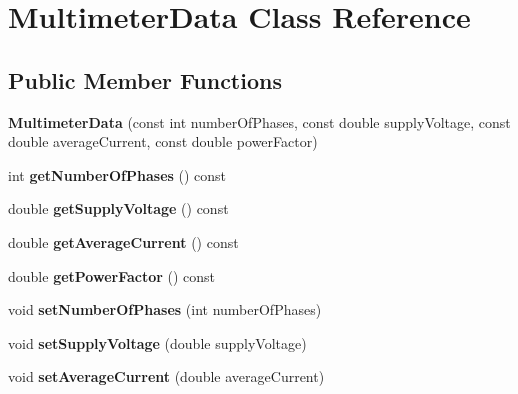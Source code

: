 \hypertarget{class_multimeter_data}{}\section{Multimeter\+Data Class Reference}
\label{class_multimeter_data}
\subsection*{Public Member Functions}
\begin{DoxyCompactItemize}
\item 
\mbox{\label{class_multimeter_data_aad9049a845612672bdf114fc515fd488}} 
{\bfseries Multimeter\+Data} (const int number\+Of\+Phases, const double supply\+Voltage, const double average\+Current, const double power\+Factor)
\item 
\mbox{\label{class_multimeter_data_ad254f94068e4a116a416aa5411415a7c}} 
int {\bfseries get\+Number\+Of\+Phases} () const
\item 
\mbox{\label{class_multimeter_data_a0a880bb110d60cbc681a9b696bf33d6c}} 
double {\bfseries get\+Supply\+Voltage} () const
\item 
\mbox{\label{class_multimeter_data_a45921cedcf2e730657f9a0fd7c1f9517}} 
double {\bfseries get\+Average\+Current} () const
\item 
\mbox{\label{class_multimeter_data_a5bd2f9e3fc4c0bcb88dddff2d9c93a8f}} 
double {\bfseries get\+Power\+Factor} () const
\item 
\mbox{\label{class_multimeter_data_a0fdfbdf0caf5cbdd8ce71db1fd229dda}} 
void {\bfseries set\+Number\+Of\+Phases} (int number\+Of\+Phases)
\item 
\mbox{\label{class_multimeter_data_a34fdca356ce74e92d8ae9128c39f76ff}} 
void {\bfseries set\+Supply\+Voltage} (double supply\+Voltage)
\item 
\mbox{\label{class_multimeter_data_a396eae0c1fb9b97372627585dc8475d8}} 
void {\bfseries set\+Average\+Current} (double average\+Current)

\end{DoxyCompactItemize}
